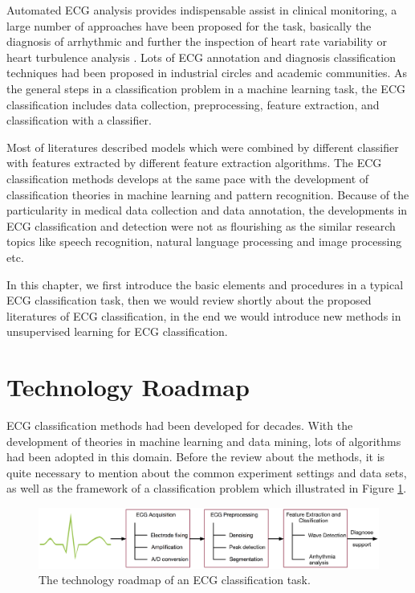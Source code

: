 \documentclass[graybox]{svmult}
\begin{document}
Automated ECG analysis provides indispensable assist in clinical monitoring, a large number of approaches have been proposed for the task, basically the diagnosis of arrhythmic and further the inspection of heart rate variability or heart turbulence analysis \citep{mar2011optimization}. 
Lots of  ECG annotation and diagnosis classification techniques had been proposed in industrial circles and academic communities. 
As the general steps in a classification problem in a machine learning task, the ECG classification includes data collection, preprocessing, feature extraction, and classification with a classifier. 

Most of literatures described models which were combined by different classifier with features extracted by different feature extraction algorithms.
The ECG classification methods develops at the same pace with the development of classification theories in machine learning and pattern recognition. 
Because of the particularity in medical data collection and data annotation, the developments in ECG classification and detection were not as flourishing as the similar research topics like speech recognition, natural language processing and image processing etc.

In this chapter, we first introduce the basic elements and procedures in a typical ECG classification task, then we would review shortly about the proposed literatures of ECG classification, in the end we would introduce new methods in unsupervised learning for ECG classification. 


\section{Technology Roadmap}
ECG classification methods had been developed for decades. With the development of theories in machine learning and data mining, lots of algorithms had been adopted in this domain. Before the review about the methods, it is quite necessary to mention about the common experiment settings and data sets, as well as the framework of a classification problem which illustrated in Figure \ref{fig:1}.


\begin{figure}[]
\sidecaption
\includegraphics[scale=.32]{classification}
%
%
\caption{The technology roadmap of an ECG classification task.}
\label{fig:1}       %
\end{figure}
\end{document}
